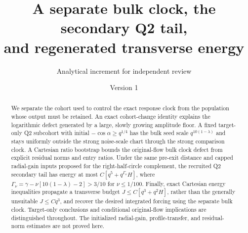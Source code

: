 \documentclass[11pt]{article}
\title{A separate bulk clock, the secondary Q2 tail,\\and regenerated transverse energy}
\author{Analytical increment for independent review}\date{Version 1}
\theoremstyle{remark}\newtheorem{remark}[theorem]{Remark}
\begin{document}
\maketitle
\begin{abstract}
We separate the cohort used to control the exact response clock from the population whose output must be retained. An exact cohort-change identity explains the logarithmic defect generated by a large, slowly growing amplitude floor. A fixed target-only Q2 subcohort with initial $-\cos\alpha\ge q^{1/4}$ has the bulk seed scale $q^{10(1-\lambda)}$ and stays uniformly outside the strong noise-scale chart through the strong comparison clock. A Cartesian ratio bootstrap bounds the original-flow bulk clock defect from explicit residual norms and entry ratios. Under the same pre-exit distance and capped radial-gain inputs proposed for the right-half-circle complement, the recruited Q2 secondary tail has energy at most $C[q^5+q^{\Gamma_\nu}H]$, where $\Gamma_\nu=\gamma-\nu[10(1-\lambda)-2]>3/10$ for $\nu\le1/100$. Finally, exact Cartesian energy inequalities propagate a transverse budget $J\le C[q^3+q^2H]$, rather than the generally unsuitable $J\le Cq^3$, and recover the desired integrated forcing using the separate bulk clock. Target-only conclusions and conditional original-flow implications are distinguished throughout. The initialized radial-gain, profile-transfer, and residual-norm estimates are not proved here.
\end{abstract}
\end{document}
